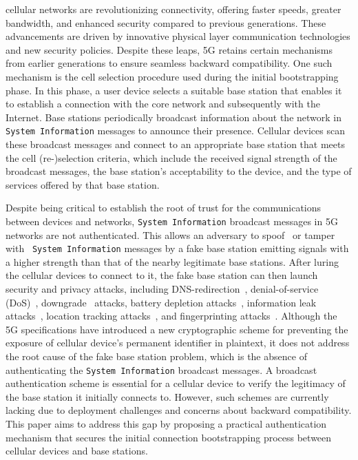  cellular networks are revolutionizing connectivity, offering faster speeds, greater bandwidth, and enhanced security compared to previous generations. These advancements are driven by innovative physical layer communication technologies and new security policies. Despite these leaps, 5G retains certain mechanisms from earlier generations to ensure seamless backward compatibility.
One such mechanism is the cell selection procedure used during the initial bootstrapping phase. In this phase, a user device selects a suitable base station that enables it to establish a connection with the core network and subsequently with the Internet.
Base stations periodically broadcast information about the network in \texttt{System Information} messages to announce their presence. Cellular devices scan these broadcast messages and connect to an appropriate base station that meets the cell (re-)selection criteria, which include the received signal strength of the broadcast messages, the base station's acceptability to the device, and the type of services offered by that base station.

Despite being critical to establish the root of trust for the communications between devices and networks, \texttt{System Information} broadcast messages in 5G networks are not authenticated. This allows an adversary to spoof~\cite{dabrowski2014imsi,hussain2019insecure} or tamper with~\cite{yang2019hiding} \texttt{System Information} messages by a fake base station emitting signals with a higher strength than that of the nearby legitimate base stations. After luring the cellular devices to connect to it, the fake base station can then launch security and privacy attacks, including DNS-redirection~\cite{rupprecht2019breaking}, denial-of-service (DoS)~\cite{shaik2015practical, hussain2018lteinspector, hussain20195greasoner, 3GPP:33.809, shaik2018impact, rashid2024state}, downgrade~\cite{shaik2015practical, hussain2018lteinspector, hussain20195greasoner, 3GPP:33.809, shaik2019new} attacks, battery depletion attacks~\cite{shaik2015practical, hussain2018lteinspector, hussain20195greasoner, 3GPP:33.809}, information leak attacks~\cite{hussain2018lteinspector, 5gbasechecker, chlosta20215g, park2022doltest, kim2019touching}, location tracking attacks~\cite{5gbasechecker, chlosta20215g, park2022doltest}, and fingerprinting attacks~\cite{5gbasechecker, park2022doltest, rashid2024state}. Although the 5G specifications \cite{3GPP:21.915} have introduced a new cryptographic scheme for preventing the exposure of cellular device's permanent identifier in plaintext, it does not address the root cause of the fake base station problem, which is the absence of authenticating the \texttt{System Information} broadcast messages. A broadcast authentication scheme is essential for a cellular device to verify the legitimacy of the base station it initially connects to. However, such schemes are currently lacking due to deployment challenges and concerns about backward compatibility. This paper aims to address this gap by proposing a practical authentication mechanism that secures the initial connection bootstrapping process between cellular devices and base stations.

